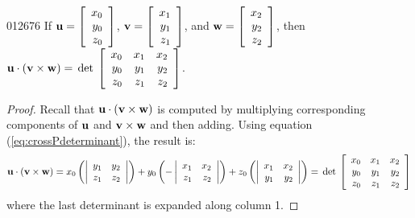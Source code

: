 \begin{theorem}{}{012676}
If 
$\textbf{u} = \left[
\begin{array}{r}
x_{0}\\
y_{0}\\
z_{0}
\end{array}
\right]$,
$\textbf{v} = \left[
\begin{array}{r}
x_{1}\\
y_{1}\\
z_{1}
\end{array}
\right]$, and 
$\textbf{w} = \left[
\begin{array}{r}
x_{2}\\
y_{2}\\
z_{2}
\end{array}
\right]$, then 
$\textbf{u} \cdot (\textbf{v} \times \textbf{w}) = \thinspace\operatorname{det\medspace}\left[
\begin{array}{rrr}
x_{0} & x_{1} & x_{2}\\
y_{0} & y_{1} & y_{2}\\
z_{0} & z_{1} & z_{2}
\end{array}
\right]$.
\end{theorem}

\begin{proof}
Recall that $\textbf{u} \cdot (\textbf{v} \times \textbf{w})$ is computed by multiplying corresponding components of $\textbf{u}$ and $\textbf{v} \times \textbf{w}$ and then adding. Using equation (\ref{eq:crossPdeterminant}), the result is:
\begin{equation*}
\textbf{u} \cdot (\textbf{v} \times \textbf{w}) 
= x_{0}\left(\left|
\begin{array}{rr}
y_{1} & y_{2}\\
z_{1} & z_{2}
\end{array}
\right|\right)
+ y_{0}\left(-
\left|
\begin{array}{rr}
x_{1} & x_{2}\\
z_{1} & z_{2}
\end{array}
\right|\right)
+z_{0}\left(
\left|
\begin{array}{rr}
x_{1} & x_{2}\\
y_{1} & y_{2}
\end{array}
\right|\right)
=
\thinspace\operatorname{det\medspace}\left[
\begin{array}{rrr}
x_{0} & x_{1} & x_{2}\\
y_{0} & y_{1} & y_{2}\\
z_{0} & z_{1} & z_{2}
\end{array}
\right]
\end{equation*}
where the last determinant is expanded along column 1.
\end{proof}

